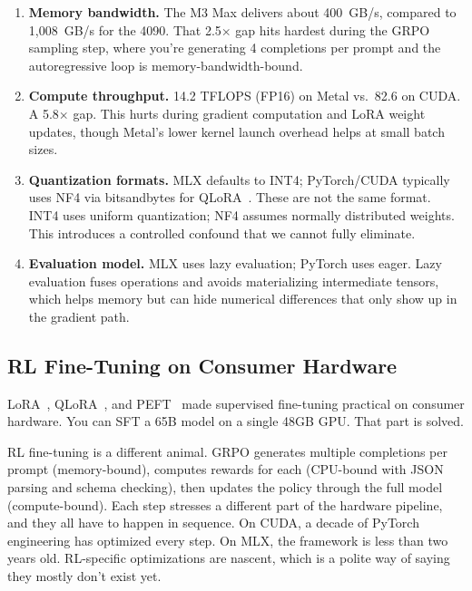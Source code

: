 \documentclass[11pt]{article}
\begin{document}
\begin{enumerate}[leftmargin=12pt]
    \item \textbf{Memory bandwidth.}  The M3 Max delivers about 400~GB/s, compared to 1{,}008~GB/s for the 4090.  That 2.5$\times$ gap hits hardest during the GRPO sampling step, where you're generating 4 completions per prompt and the autoregressive loop is memory-bandwidth-bound.

    \item \textbf{Compute throughput.}  14.2 TFLOPS (FP16) on Metal vs.\ 82.6 on CUDA.  A 5.8$\times$ gap.  This hurts during gradient computation and LoRA weight updates, though Metal's lower kernel launch overhead helps at small batch sizes.

    \item \textbf{Quantization formats.}  MLX defaults to INT4; PyTorch/CUDA typically uses NF4 via bitsandbytes for QLoRA~\citep{dettmers2023qlora}.  These are not the same format.  INT4 uses uniform quantization; NF4 assumes normally distributed weights.  This introduces a controlled confound that we cannot fully eliminate.

    \item \textbf{Evaluation model.}  MLX uses lazy evaluation; PyTorch uses eager.  Lazy evaluation fuses operations and avoids materializing intermediate tensors, which helps memory but can hide numerical differences that only show up in the gradient path.
\end{enumerate}

\subsection{RL Fine-Tuning on Consumer Hardware}

LoRA~\citep{hu2021lora}, QLoRA~\citep{dettmers2023qlora}, and PEFT~\citep{mangrulkar2022peft} made supervised fine-tuning practical on consumer hardware.  You can SFT a 65B model on a single 48GB GPU.  That part is solved.

RL fine-tuning is a different animal.  GRPO generates multiple completions per prompt (memory-bound), computes rewards for each (CPU-bound with JSON parsing and schema checking), then updates the policy through the full model (compute-bound).  Each step stresses a different part of the hardware pipeline, and they all have to happen in sequence.  On CUDA, a decade of PyTorch engineering has optimized every step.  On MLX, the framework is less than two years old.  RL-specific optimizations are nascent, which is a polite way of saying they mostly don't exist yet.
\end{document}

